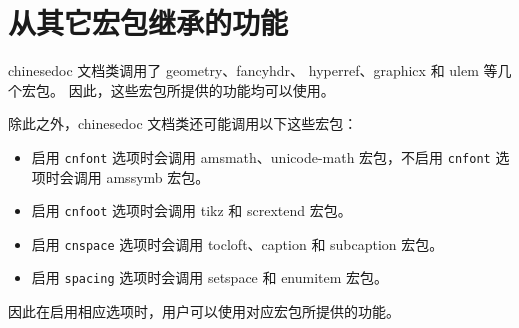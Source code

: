 \section{从其它宏包继承的功能}
\label{sec:thirdparty}

chinesedoc 文档类调用了 geometry、fancyhdr、%
hyperref、graphicx 和 ulem 等几个宏包。
因此，这些宏包所提供的功能均可以使用。

除此之外，chinesedoc 文档类还可能调用以下这些宏包：
\begin{itemize}
    \item 启用 \verb|cnfont| 选项时会调用 amsmath、unicode-math 宏包，不启用
        \verb|cnfont| 选项时会调用 amssymb 宏包。
    \item 启用 \verb|cnfoot| 选项时会调用
        tikz 和 scrextend 宏包。
    \item 启用 \verb|cnspace| 选项时会调用
        tocloft、caption 和 subcaption 宏包。
    \item 启用 \verb|spacing| 选项时会调用 setspace 和
        enumitem 宏包。
\end{itemize}
因此在启用相应选项时，用户可以使用对应宏包所提供的功能。
